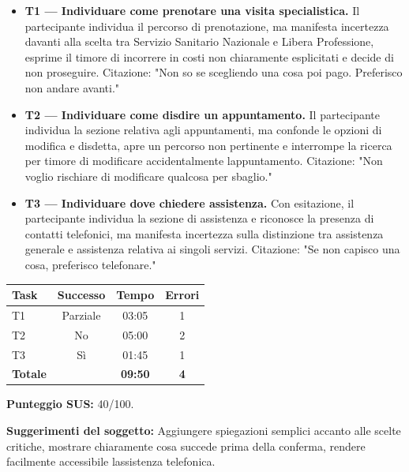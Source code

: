 \begin{itemize}
\item
  \textbf{T1 --- Individuare come prenotare una visita specialistica.}
  Il partecipante
  individua il percorso di prenotazione, ma manifesta incertezza
  davanti alla scelta tra Servizio Sanitario Nazionale e Libera
  Professione, esprime il timore di incorrere in costi non
  chiaramente esplicitati e decide di non proseguire. Citazione: "Non
  so se scegliendo una cosa poi pago. Preferisco non andare avanti."
\item
  \textbf{T2 --- Individuare come disdire un appuntamento.} Il partecipante individua la sezione
  relativa agli appuntamenti, ma confonde le opzioni di modifica e
  disdetta, apre un percorso non pertinente e interrompe la ricerca
  per timore di modificare accidentalmente l\textquotesingle appuntamento.
  Citazione: "Non voglio rischiare di modificare qualcosa per
  sbaglio."
\item
  \textbf{T3 --- Individuare dove chiedere assistenza.} Con esitazione, il partecipante individua
  la sezione di assistenza e riconosce la presenza di contatti
  telefonici, ma manifesta incertezza sulla distinzione tra assistenza
  generale e assistenza relativa ai singoli servizi. Citazione: "Se
  non capisco una cosa, preferisco telefonare."
\end{itemize}

\begin{center}
\begin{minipage}{\linewidth}
\centering
{}\label{tab:a-4}
\noindent\begin{tabular}{lccc}
\toprule
\textbf{Task} & \textbf{Successo} & \textbf{Tempo} & \textbf{Errori} \\
\midrule
T1 & Parziale & 03:05 & 1 \\
T2 & No & 05:00 & 2 \\
T3 & Sì & 01:45 & 1 \\
\midrule
\textbf{Totale} & & \textbf{09:50} & \textbf{4} \\
\bottomrule
\end{tabular}
\end{minipage}
\end{center}

\textbf{Punteggio SUS:} 40/100.

\textbf{Suggerimenti del soggetto:} Aggiungere spiegazioni semplici
accanto alle scelte critiche, mostrare chiaramente cosa succede prima
della conferma, rendere facilmente accessibile l\textquotesingle assistenza
telefonica.

